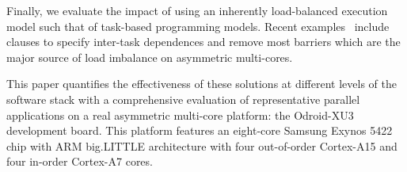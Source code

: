 Finally, we evaluate the impact of using an inherently load-balanced execution model such 
that of task-based programming models. 
Recent examples~\cite{Ayguade:TPDS2009, OpenMP4.0:Manual2013, OmpSs_PPL11, Zuckerman:EXADAPT2011, Bauer.2012.SC, Vandierendonck:PACT2011, Vandierendonck:Hyperq} 
include clauses to specify inter-task dependences and remove most barriers which are the major 
source of load imbalance on asymmetric multi-cores.


This paper quantifies the effectiveness of these solutions at different levels of the software stack
with a comprehensive evaluation of representative parallel applications on a real 
asymmetric multi-core platform: the Odroid-XU3 development board. This platform features an 
eight-core Samsung Exynos 5422 chip with ARM big.LITTLE architecture with 
four out-of-order Cortex-A15 and four in-order Cortex-A7 cores.

